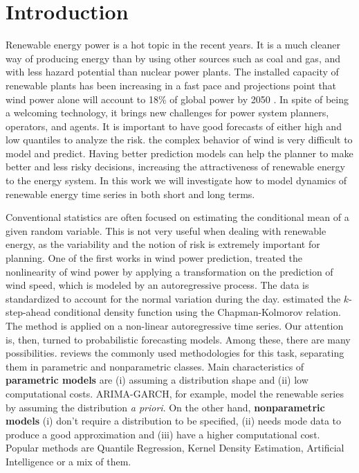 \section{Introduction}


Renewable energy power is a hot topic in the recent years. It is a much cleaner way of producing energy than by using other sources such as coal and gas, and with less hazard potential than nuclear power plants. The installed capacity of renewable plants has been increasing in a fast pace and projections point that wind power alone will account to 18\% of global power by 2050  \cite{IntEnerAgency}.
In spite of being a welcoming technology, it brings new challenges for power system planners, operators, and agents. It is important to have good forecasts of either high and low quantiles to analyze the risk.
the complex behavior of wind is very difficult to model and predict.  
Having better prediction models can help the planner to make better and less risky decisions, increasing the attractiveness of renewable energy to the energy system. 
In this work we will investigate how to model dynamics of renewable energy time series in both short and long terms.


Conventional statistics are often focused on estimating the conditional mean of a given random variable. This is not very useful when dealing with renewable energy, as the variability and the notion of risk is extremely important for planning.
One of the first works in wind power prediction, \cite{brown_time_1984} treated the nonlinearity of wind power by applying a transformation on the prediction of wind speed, which is modeled by an autoregressive process. The data is standardized to account for the normal variation during the day.
\cite{moeanaddin_numerical_1990} estimated the $k$-step-ahead conditional density function using the Chapman-Kolmorov relation. The method is applied on a non-linear autoregressive time series.
Our attention is, then, turned to probabilistic forecasting models. Among these, there are many possibilities. \cite{zhang_review_2014} reviews the commonly used methodologies for this task, separating them in parametric and nonparametric classes. Main characteristics of \textbf{parametric models} are (i) assuming a distribution shape and (ii) low computational costs. ARIMA-GARCH, for example, model the renewable series by assuming the distribution \textit{a priori}. On the other hand, \textbf{nonparametric models} (i) don't require a distribution to be specified, (ii) needs mode data to produce a good approximation and (iii) have a higher computational cost. Popular methods are Quantile Regression, Kernel Density Estimation,  Artificial Intelligence or a mix of them.


